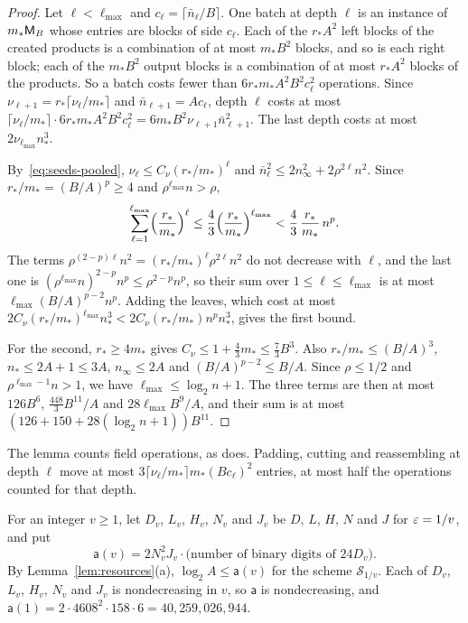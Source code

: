 \begin{proof}
Let \(\ell<\ell_{\max}\) and \(c_\ell=\lceil\bar n_\ell/B\rceil\). One
batch at depth \(\ell\) is an instance of \(m_*\mathsf M_B\) whose entries are
blocks of side \(c_\ell\). Each of the \(r_*A^2\) left blocks of the
created products is a combination of at most \(m_*B^2\) blocks, and so is
each right block; each of the \(m_*B^2\) output blocks is a combination of
at most \(r_*A^2\) blocks of the products. So a batch costs fewer than
\(6r_*m_*A^2B^2c_\ell^2\) operations. Since
\(\nu_{\ell+1}=r_*\lceil\nu_\ell/m_*\rceil\) and
\(\bar n_{\ell+1}=Ac_\ell\), depth \(\ell\) costs at most
\(\lceil\nu_\ell/m_*\rceil\cdot6r_*m_*A^2B^2c_\ell^2
=6m_*B^2\nu_{\ell+1}\bar n_{\ell+1}^2\). The last depth costs at most
\(2\nu_{\ell_{\max}}n_*^3\).

By~\eqref{eq:seeds-pooled}, \(\nu_\ell\le C_\nu(r_*/m_*)^\ell\) and
\(\bar n_\ell^2\le2n_\infty^2+2\rho^{2\ell}n^2\). Since
\(r_*/m_*=(B/A)^p\ge4\) and \(\rho^{\ell_{\max}}n>\rho\),
\[
 \sum_{\ell=1}^{\ell_{\max}}\Bigl(\frac{r_*}{m_*}\Bigr)^\ell
 \le\frac43\Bigl(\frac{r_*}{m_*}\Bigr)^{\ell_{\max}}
 <\frac43\,\frac{r_*}{m_*}\,n^p .
\]
The terms \(\rho^{(2-p)\ell}n^2=(r_*/m_*)^\ell\rho^{2\ell}n^2\) do not
decrease with \(\ell\), and the last one is
\((\rho^{\ell_{\max}}n)^{2-p}n^p\le\rho^{2-p}n^p\), so their sum over
\(1\le\ell\le\ell_{\max}\) is at most \(\ell_{\max}(B/A)^{p-2}n^p\).
Adding the leaves, which cost at most
\(2C_\nu(r_*/m_*)^{\ell_{\max}}n_*^3<2C_\nu(r_*/m_*)n^pn_*^3\), gives the
first bound.

For the second, \(r_*\ge4m_*\) gives
\(C_\nu\le1+\frac43m_*\le\frac73B^3\). Also \(r_*/m_*\le(B/A)^3\),
\(n_*\le2A+1\le3A\), \(n_\infty\le2A\) and \((B/A)^{p-2}\le B/A\). Since
\(\rho\le1/2\) and \(\rho^{\ell_{\max}-1}n>1\), we have
\(\ell_{\max}\le\log_2n+1\). The three terms are then at most
\(126B^6\), \(\frac{448}3B^{11}/A\) and \(28\ell_{\max}B^9/A\), and their sum
is at most \((126+150+28(\log_2n+1))B^{11}\).
\end{proof}

The lemma counts field operations, as \citep[Corollary~9.7]{FinCon26}
does. Padding, cutting and reassembling at depth \(\ell\) move at most
\(3\lceil\nu_\ell/m_*\rceil m_*(Bc_\ell)^2\) entries, at most half the
operations counted for that depth.

For an integer \(v\ge1\), let \(D_v\), \(L_v\), \(H_v\), \(N_v\) and
\(J_v\) be \(D\), \(L\), \(H\), \(N\) and \(J\) for \(\varepsilon=1/v\), and put
\[
 \mathsf a(v)=2N_v^2J_v\cdot\bigl(\text{number of binary digits of }24D_v\bigr).
\]
By Lemma~\ref{lem:resources}(a), \(\log_2A\le\mathsf a(v)\) for the scheme
\(\mathcal S_{1/v}\). Each of \(D_v\), \(L_v\), \(H_v\), \(N_v\) and \(J_v\)
is nondecreasing in \(v\), so \(\mathsf a\) is nondecreasing, and
\(\mathsf a(1)=2\cdot4608^2\cdot158\cdot6=40{,}259{,}026{,}944\).

